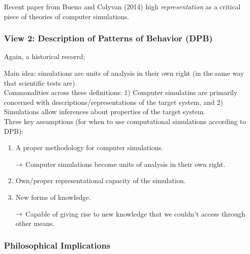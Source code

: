 Recent paper from Bueno and Colyvan (2014) high {\it representation} as a critical piece of theories of computer simulations.

\subsubsection{View 2: Description of Patterns of Behavior (DPB)}

Again, a historical recorrd;



Main idea: simulations are units of analysis in their own right (in the same way that scientific tests are). \\


Commonalities across these definitions: 1) Computer simulatins are primarily concerned with descriptions/representations of the target system, and 2) Simulations allow inferences about properties of the target system. \\


Three key assumptions (for when to use computational simulations according to DPB):
\begin{enumerate}
\item A proper methodology for computer simulations.

	$\rightarrow$ Computer simulations become units of analysis in their own right. 

\item Own/proper representational capacity of the simulation.

\item New forms of knowledge.

	$\rightarrow$ Capable of giving rise to new knowledge that we couldn't access through other means.
	\end{enumerate}



\subsubsection{Philosophical Implications}

